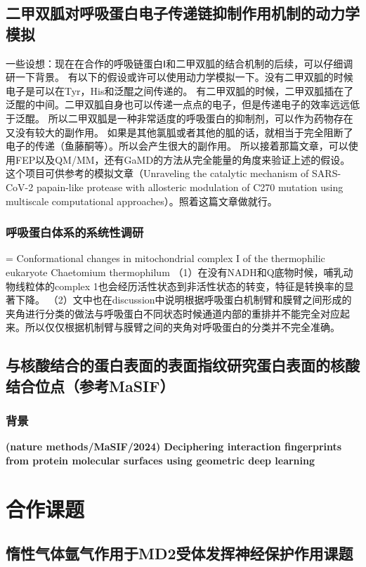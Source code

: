 \section{二甲双胍对呼吸蛋白电子传递链抑制作用机制的动力学模拟}
一些设想：现在在合作的呼吸链蛋白Ⅰ和二甲双胍的结合机制的后续，可以仔细调研一下背景。
有以下的假设或许可以使用动力学模拟一下。没有二甲双胍的时候电子是可以在Tyr，His和泛醌之间传递的。
有二甲双胍的时候，二甲双胍插在了泛醌的中间。二甲双胍自身也可以传递一点点的电子，但是传递电子的效率远远低于泛醌。
所以二甲双胍是一种非常适度的呼吸蛋白的抑制剂，可以作为药物存在又没有较大的副作用。
如果是其他氯胍或者其他的胍的话，就相当于完全阻断了电子的传递（鱼藤酮等）。所以会产生很大的副作用。
所以接着那篇文章，可以使用FEP以及QM/MM，还有GaMD的方法从完全能量的角度来验证上述的假设。
这个项目可供参考的模拟文章（Unraveling the catalytic mechanism of SARS-CoV-2 papain-like protease with allosteric modulation of C270 mutation using multiscale computational approaches）。照着这篇文章做就行。
\subsection{呼吸蛋白体系的系统性调研}
\noindent = Conformational changes in mitochondrial complex I of the thermophilic eukaryote Chaetomium thermophilum
\newline （1）在没有NADH和Q底物时候，哺乳动物线粒体的complex 1也会经历活性状态到非活性状态的转变，特征是转换率的显著下降。
\newline （2）文中也在discussion中说明根据呼吸蛋白机制臂和膜臂之间形成的夹角进行分类的做法与呼吸蛋白不同状态时候通道内部的重排并不能完全对应起来。所以仅仅根据机制臂与膜臂之间的夹角对呼吸蛋白的分类并不完全准确。
\section{与核酸结合的蛋白表面的表面指纹研究蛋白表面的核酸结合位点（参考MaSIF）}
\subsection{背景}
\noindent \textbf{(nature methods/MaSIF/2024) Deciphering interaction fingerprints from protein molecular surfaces using geometric deep learning}
\chapter{合作课题}
\section{惰性气体氩气作用于MD2受体发挥神经保护作用课题}   
